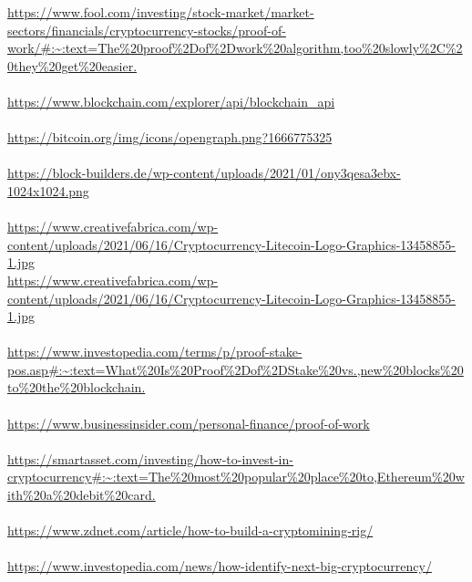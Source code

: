 \documentclass[ngerman]{scrreprt}
\begin{document}
\url{https://www.fool.com/investing/stock-market/market-sectors/financials/cryptocurrency-stocks/proof-of-work/#:~:text=The%20proof%2Dof%2Dwork%20algorithm,too%20slowly%2C%20they%20get%20easier.} \\ \\
\url{https://www.blockchain.com/explorer/api/blockchain_api} \\ \\
\url{https://bitcoin.org/img/icons/opengraph.png?1666775325} \\ \\
\url{https://block-builders.de/wp-content/uploads/2021/01/ony3qesa3ebx-1024x1024.png} \\ \\
\url{https://www.creativefabrica.com/wp-content/uploads/2021/06/16/Cryptocurrency-Litecoin-Logo-Graphics-13458855-1.jpg}\\
\url{https://www.creativefabrica.com/wp-content/uploads/2021/06/16/Cryptocurrency-Litecoin-Logo-Graphics-13458855-1.jpg}\\ \\
\url{https://www.investopedia.com/terms/p/proof-stake-pos.asp#:~:text=What%20Is%20Proof%2Dof%2DStake%20vs.,new%20blocks%20to%20the%20blockchain.}\\ \\
\url{https://www.businessinsider.com/personal-finance/proof-of-work}\\ \\
\url{https://smartasset.com/investing/how-to-invest-in-cryptocurrency#:~:text=The%20most%20popular%20place%20to,Ethereum%20with%20a%20debit%20card.}\\ \\
\url{https://www.zdnet.com/article/how-to-build-a-cryptomining-rig/}\\ \\
\url{https://www.investopedia.com/news/how-identify-next-big-cryptocurrency/}\\ \\
\end{document}
